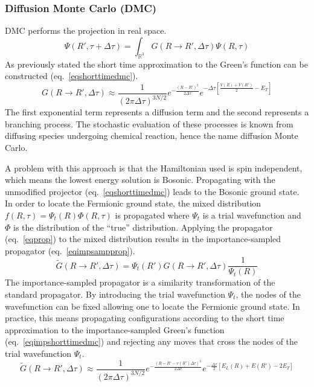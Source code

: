 \subsubsection{Diffusion Monte Carlo (DMC)}
DMC performs the projection in real space.\cite{Toulouse2016,Foulkes2001}
\begin{equation}
    \Psi(R',\tau + \Delta\tau) = \int_{\mathbb{R}^3} G(R \rightarrow R',\Delta \tau) \Psi(R,\tau)
\end{equation}
As previously stated the short time approximation to the Green's function can be constructed (eq.~\ref{eqshorttimedmc}).
\begin{equation}
    G(R \rightarrow R', \Delta \tau) \approx \frac{1}{(2\pi\Delta\tau)^{3N/2}} e^{-\frac{(R - R')^2 }{2\Delta\tau}} e^{-\Delta\tau[\frac{V(R) + V(R')}{2} - E_T]}
\label{eqshorttimedmc}
\end{equation}
The first exponential term represents a diffusion term and the second represents a branching process.
The stochastic evaluation of these processes is known from diffusing species undergoing chemical reaction, hence the name diffusion Monte Carlo.

A problem with this approach is that the Hamiltonian used is spin independent, which means the lowest energy solution is Bosonic.
Propagating with the unmodified projector (eq.~\ref{eqshorttimedmc}) leads to the Bosonic ground state.
In order to locate the Fermionic ground state, the mixed distribution $f(R,\tau) = \Psi_t(R)\Phi(R,\tau)$ is propagated where $\Psi_t$ is a trial wavefunction and $\Phi$ is the distribution of the ``true'' distribution.
Applying the propagator (eq.~\ref{eqprop}) to the mixed distribution results in the importance-sampled propagator (eq.~\ref{eqimpsampprop}). 
\begin{equation}
    \tilde{G}(R \rightarrow R', \Delta \tau)  = \Psi_t(R') G(R \rightarrow R', \Delta \tau) \frac{1}{\Psi_t(R)}
\label{eqimpsampprop}
\end{equation}
The importance-sampled propagator is a similarity transformation of the standard propagator.
By introducing the trial wavefunction $\Psi_t$, the nodes of the wavefunction can be fixed allowing one to locate the Fermionic ground state.
In practice, this means propagating configurations according to the short time approximation to the importance-sampled Green's function (eq.~\ref{eqimpshorttimedmc}) and rejecting any moves that cross the nodes of the trial wavefunction $\Psi_t$.
\begin{equation}
    \tilde{G}(R \rightarrow R', \Delta \tau) \approx \frac{1}{(2\pi\Delta\tau)^{3N/2}} e^{-\frac{(R - R' - v(R') \Delta \tau)^2 }{2\Delta\tau}} e^{-\frac{\Delta\tau}{2}[E_L(R) + E(R') - 2E_T]}
\label{eqimpshorttimedmc}
\end{equation}



